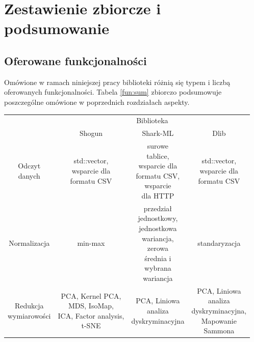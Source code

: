 \chapter{Zestawienie zbiorcze i podsumowanie}

\section{Oferowane funkcjonalności}

Omówione w ramach niniejszej pracy biblioteki różnią się typem i liczbą oferowanych funkcjonalności. Tabela \ref{fun:sum} zbiorczo podsumowuje poszczególne omówione w poprzednich rozdziałach aspekty.

\begin{longtable}{c | c | c | c}
	\centering
	\multirow{2}{*}{\makecell{Funkcjonalność}} & \multicolumn{3}{c}{Biblioteka} \\
	\cline{2-4}
	 &  Shogun & Shark-ML & Dlib \\
	\hline
	\makecell{Odczyt \\ danych} & \makecell{std::vector, \\ wsparcie dla \\ formatu CSV} & \makecell{surowe \\ tablice, \\ wsparcie dla \\ formatu CSV, \\ wsparcie \\ dla HTTP} & \makecell{std::vector, \\ wsparcie dla \\ formatu CSV} \\
	\hline
	{Normalizacja} & min-max & \makecell{przedział \\ jednostkowy, \\ jednostkowa \\ wariancja, \\ zerowa \\ średnia i \\ wybrana \\ wariancja} & standaryzacja \\
	\hline
	\makecell{Redukcja \\ wymiarowości} & \makecell{PCA, Kernel PCA, \\ MDS, IsoMap, \\ ICA, Factor analysis, \\t-SNE} & \makecell{PCA, Liniowa \\ analiza \\ dyskryminacyjna} & \makecell{PCA, Liniowa \\ analiza \\ dyskryminacyjna, \\ Mapowanie \\ Sammona} \\

\end{longtable}
